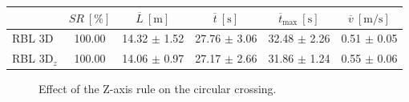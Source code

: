 \begin{itemize}
\begin{table}[H]
                    \begin{tabular}{|l|c|c|c|c|c|}
                    \hline
                                                & \( SR \ [\%] \) & \( \overline{L} \ [\mathrm{m}] \) & \( \overline{t} \ [\mathrm{s}] \) & \( \overline{t}_{\text{max}} \ [\mathrm{s}] \) & \( \overline{v} \ [\mathrm{m/s}] \)     \\ \hline
                    RBL 3D                      & 100.00          & 14.32 $\pm$ 1.52                  & 27.76 $\pm$ 3.06                  & 32.48 $\pm$ 2.26                               & 0.51 $\pm$ 0.05                         \\ \hline
                    RBL 3D\(_z\)                & 100.00          & 14.06 $\pm$ 0.97                  & 27.17 $\pm$ 2.66                  & 31.86 $\pm$ 1.24                               & 0.55 $\pm$ 0.06                         \\ \hline
                    \end{tabular}
                \end{table}
        \end{itemize}

        \begin{figure}[H]
            \centering
            \caption{
                Effect of the Z-axis rule on the circular crossing. 
            }
            \label{fig:z_ax_rule_cross}
        \end{figure}


